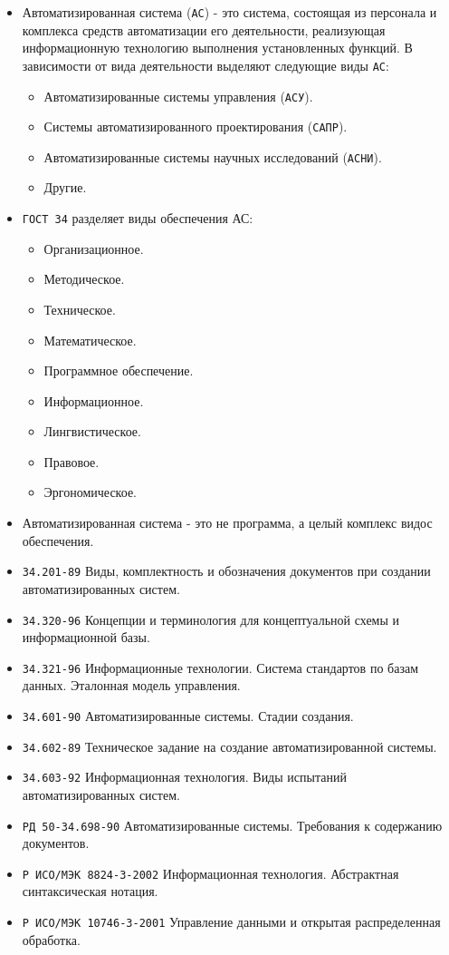 \documentclass[a4paper, 14pt]{article}
\begin{document}
\begin{itemize}
    \item Автоматизированная система (\texttt{АС}) - это система, состоящая из персонала и комплекса средств автоматизации его деятельности, реализующая информационную технологию выполнения установленных функций. В зависимости от вида деятельности выделяют следующие виды \texttt{АС}:
    \begin{itemize}
        \item Автоматизированные системы управления (\texttt{АСУ}).
        \item Системы автоматизированного проектирования (\texttt{САПР}).
        \item Автоматизированные системы научных исследований (\texttt{АСНИ}).
        \item Другие.
    \end{itemize}
    \item \texttt{ГОСТ 34} разделяет виды обеспечения АС:
    \begin{itemize}
        \item Организационное.
        \item Методическое.
        \item Техническое.
        \item Математическое.
        \item Программное обеспечение.
        \item Информационное.
        \item Лингвистическое.
        \item Правовое.
        \item Эргономическое.
    \end{itemize}
    \item Автоматизированная система - это не программа, а целый комплекс видос обеспечения.
    \item \texttt{34.201-89} Виды, комплектность и обозначения документов при создании автоматизированных систем.
    \item \texttt{34.320-96} Концепции и терминология для концептуальной схемы и информационной базы.
    \item \texttt{34.321-96} Информационные технологии. Система стандартов по базам данных. Эталонная модель управления.
    \item \texttt{34.601-90} Автоматизированные системы. Стадии создания.
    \item \texttt{34.602-89} Техническое задание на создание автоматизированной системы.
    \item \texttt{34.603-92} Информационная технология. Виды испытаний автоматизированных систем.
    \item \texttt{РД 50-34.698-90} Автоматизированные системы. Требования к содержанию документов.
    \item \texttt{Р ИСО/МЭК 8824-3-2002} Информационная технология. Абстрактная синтаксическая нотация.
    \item \texttt{Р ИСО/МЭК 10746-3-2001} Управление данными и открытая распределенная обработка.
\end{itemize}
\end{document}
